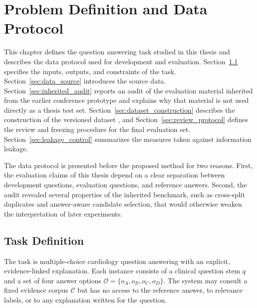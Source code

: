 \chapter{Problem Definition and Data Protocol}
\label{chap:problem_data}


This chapter defines the question answering task studied in this thesis and describes the data protocol used for development and evaluation. Section~\ref{sec:task_definition} specifies the inputs, outputs, and constraints of the task. Section~\ref{sec:data_source} introduces the source data. Section~\ref{sec:inherited_audit} reports an audit of the evaluation material inherited from the earlier conference prototype and explains why that material is not used directly as a thesis test set. Section~\ref{sec:dataset_construction} describes the construction of the versioned dataset \dataversion{}, and Section~\ref{sec:review_protocol} defines the review and freezing procedure for the final evaluation set. Section~\ref{sec:leakage_control} summarizes the measures taken against information leakage.

The data protocol is presented before the proposed method for two reasons. First, the evaluation claims of this thesis depend on a clear separation between development questions, evaluation questions, and reference answers. Second, the audit revealed several properties of the inherited benchmark, such as cross-split duplicates and answer-aware candidate selection, that would otherwise weaken the interpretation of later experiments.

\section{Task Definition}
\label{sec:task_definition}

The task is multiple-choice cardiology question answering with an explicit, evidence-linked explanation. Each instance consists of a clinical question stem $q$ and a set of four answer options $\mathcal{O} = \{o_A, o_B, o_C, o_D\}$. The system may consult a fixed evidence corpus $\mathcal{C}$ but has no access to the reference answer, to relevance labels, or to any explanation written for the question.

